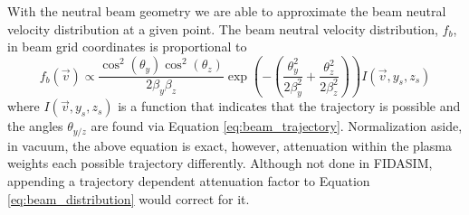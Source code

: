 With the neutral beam geometry we are able to approximate the beam neutral velocity distribution at a given point. The beam neutral velocity distribution, $f_b$, in beam grid coordinates is proportional to
\begin{equation}\label{eq:beam_distribution}
    f_b(\vec{v}) \propto \frac{\cos^2(\theta_y)\cos^2(\theta_z)}{2\beta_y\beta_z}\exp\left(-\left(\frac{\theta_y^2}{2\beta_y^2} + \frac{\theta_z^2}{2\beta_z^2}\right)\right)I(\vec{v},y_s,z_s)
\end{equation}
where $I(\vec{v},y_s,z_s)$ is a function that indicates that the trajectory is possible and the angles $\theta_{y/z}$ are found via Equation \ref{eq:beam_trajectory}. Normalization aside, in vacuum, the above equation is exact, however, attenuation within the plasma weights each possible trajectory differently. Although not done in FIDASIM, appending a trajectory dependent attenuation factor to Equation \ref{eq:beam_distribution} would correct for it.

